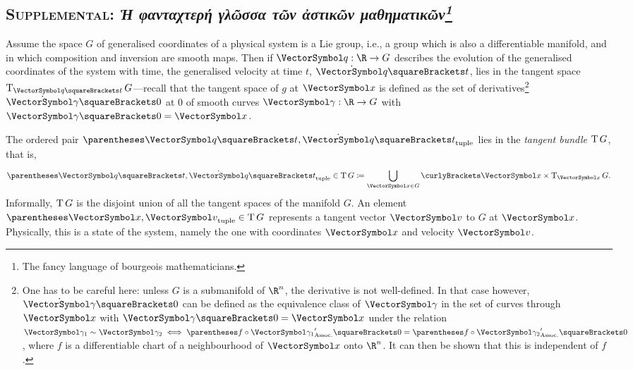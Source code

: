 \documentclass[10pt, a4paper, twoside]{lecturenotes}
\newcommand{\Rn}{{\R^n}}
\begin{document}
\begin{supplemental}
\subsection{\textsc{Supplemental: }\emph{\texorpdfstring{\textgreek{Ἡ φανταχτερή γλῶσσα τῶν ἀστικῶν μαθηματικῶν\footnote{The fancy language of bourgeois mathematicians.}}}{Ἡ φανταχτερή γλῶσσα τῶν ἀστικῶν μαθηματικῶν}}}
\begingroup
\newcommand{\VelocitySpace}{\LieAlgebraSymbol{g}}
\newcommand{\MomentumSpace}{\Dual\VelocitySpace}
\newcommand{\Lagrangian}{\mathscr{L}}
\newcommand{\Hamiltonian}{\mathscr{H}}
\newcommand{\eqrel}{\sim}
Assume the space $G$ of generalised coordinates of a physical system is a Lie group, i.e., a group which is also a differentiable manifold, and in which composition and inversion are smooth maps. Then if $\FunctionSpec\vq \R G$ describes the evolution of the generalised coordinates of the system with time, the generalised velocity at time $t$, $\TimeDerivative\vq\of t$, lies in the tangent space $\TangentSpace{\vq\of t}G$---recall that the tangent space of $g$ at $\vx$ is defined as the set of derivatives\footnote{One has to be careful here: unless $G$ is a submanifold of $\Rn$, the derivative is not well-defined. In that case however, $\TimeDerivative \vgg\of 0$ can be defined as the equivalence class of $\vgg$ in the set of curves through $\vx$ with $\vgg\of 0 = \vx$ under the relation $\vgg_1\eqrel\vgg_2 \Equivalent \pa{f\Compose\vgg_1}\der\of 0 = \pa{f\Compose\vgg_2}\der\of 0$, where $f$ is a differentiable chart of a neighbourhood of $\vx$ onto $\Rn$. It can then be shown that this is independent of $f$.} $\TimeDerivative \vgg\of 0$ at $0$ of smooth curves $\FunctionSpec\vgg\R G$ with $\vgg\of 0 = \vx$.

The ordered pair $\tuple{\vq\of t,\TimeDerivative\vq\of t}$ lies in the \emph{tangent bundle} $\operatorname{T}{G}$, that is,
\begin{equation*}
\tuple{\vq\of t,\TimeDerivative\vq\of t} \in \TangentBundle G \DefineAs \UnionOver{\vx \in G} \set{\vx} \Cartesian \TangentSpace{\vx}G\text{.}
\end{equation*}
Informally, $\operatorname{T}{G}$ is the disjoint union of all the tangent spaces of the manifold $G$. An element $\tuple{\vx,\vv}\in \TangentBundle G$  represents a tangent vector $\vv$ to $G$ at $\vx$. Physically, this is a state of the system, namely the one with coordinates $\vx$ and velocity $\vv$. 


\end{supplemental}
\end{document}
